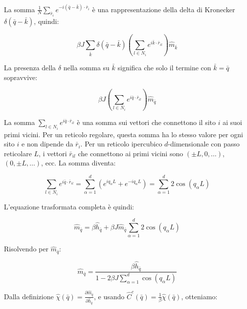 La somma $\frac{1}{N}\sum_{\bar{r}_i} e^{-i(\bar{q}-\bar{k})\cdot\bar{r}_i}$ è una rappresentazione della delta di Kronecker $\delta(\bar{q}-\bar{k})$, quindi:

\begin{equation} \label{eq:ch19_16}
\beta J \sum_{\bar{k}} \delta(\bar{q}-\bar{k}) \left( \sum_{l \in N_i} e^{i\bar{k}\cdot\bar{r}_{il}} \right) \hat{m}_{\bar{k}}
\end{equation}

La presenza della $\delta$ nella somma su $\bar{k}$ significa che solo il termine con $\bar{k}=\bar{q}$ sopravvive:

\begin{equation} \label{eq:ch19_17}
\beta J  \left( \sum_{l \in N_i} e^{i\bar{q}\cdot\bar{r}_{il}} \right) \hat{m}_{\bar{q}}
\end{equation}

La somma $\sum_{l \in N_i} e^{i\bar{q}\cdot\bar{r}_{il}}$ è una somma sui vettori che connettono il sito $i$ ai suoi primi vicini. Per un reticolo regolare, questa somma ha lo stesso valore per ogni sito $i$ e non dipende da $\bar{r}_i$.
Per un reticolo ipercubico $d$-dimensionale con passo reticolare $L$, i vettori $\bar{r}_{il}$ che connettono ai primi vicini sono $(\pm L, 0, \dots)$, $(0, \pm L, \dots)$, ecc. La somma diventa:

\begin{equation} \label{eq:ch19_18}
\sum_{l \in N_i} e^{i\bar{q}\cdot\bar{r}_{il}} = \sum_{\alpha=1}^{d} (e^{iq_{\alpha}L} + e^{-iq_{\alpha}L}) = \sum_{\alpha=1}^{d} 2\cos(q_{\alpha}L)
\end{equation}

L'equazione trasformata completa è quindi:

\begin{equation} \label{eq:ch19_19}
\hat{m}_{\bar{q}} = \beta \hat{h}_{\bar{q}} + \beta J \hat{m}_{\bar{q}} \sum_{\alpha=1}^{d} 2\cos(q_{\alpha}L)
\end{equation}

Risolvendo per $\hat{m}_{\bar{q}}$:

\begin{equation} \label{eq:ch19_20}
\hat{m}_{\bar{q}} = \frac{\beta \hat{h}_{\bar{q}}}{1 - 2\beta J \sum_{\alpha=1}^{d} \cos(q_{\alpha}L)}
\end{equation}

Dalla definizione $\hat{\chi}(\bar{q}) =\frac{\partial \hat{m}_{\bar{q}} }{ \partial \hat{h}_{\bar{q}}}$, e usando $\hat{C}^c(\bar{q}) = \frac{1}{\beta} \hat{\chi}(\bar{q})$, otteniamo:

